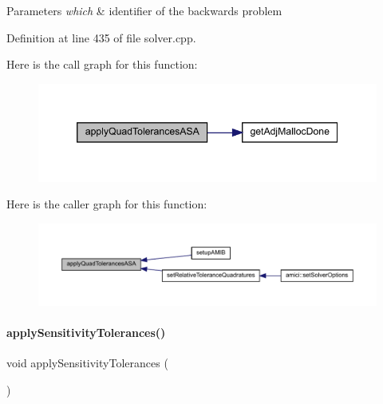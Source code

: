 \begin{DoxyParams}{Parameters}
{\em which} & identifier of the backwards problem \\
\hline
\end{DoxyParams}


Definition at line 435 of file solver.\+cpp.

Here is the call graph for this function\+:
\nopagebreak
\begin{figure}[H]
\begin{center}
\leavevmode
\includegraphics[width=346pt]{classamici_1_1_solver_a09d47957ba70f725efb5e3a385a274a6_cgraph}
\end{center}
\end{figure}
Here is the caller graph for this function\+:
\nopagebreak
\begin{figure}[H]
\begin{center}
\leavevmode
\includegraphics[width=350pt]{classamici_1_1_solver_a09d47957ba70f725efb5e3a385a274a6_icgraph}
\end{center}
\end{figure}
\mbox{\label{classamici_1_1_solver_a2d93ff630e5bb38f4bc6d8b47b46bd73}} 
\paragraph{\texorpdfstring{apply\+Sensitivity\+Tolerances()}{applySensitivityTolerances()}}
{\footnotesize\ttfamily void apply\+Sensitivity\+Tolerances (\begin{DoxyParamCaption}{ }\end{DoxyParamCaption})\hspace{0.3cm}{\ttfamily [protected]}}


